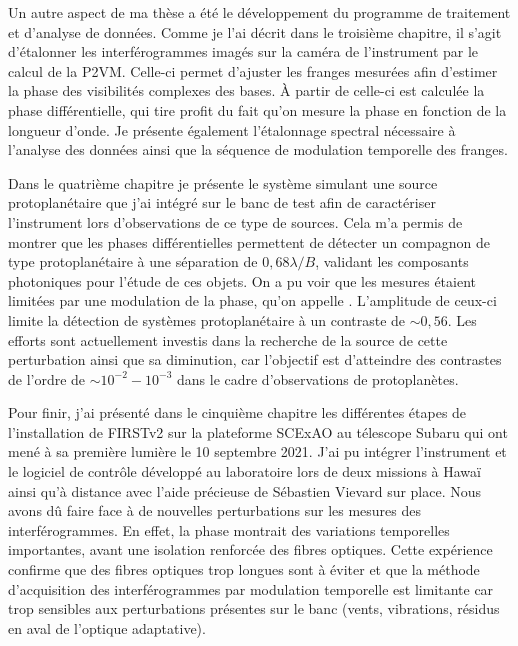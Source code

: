 Un autre aspect de ma thèse a été le développement du programme de traitement et d'analyse de données. Comme je l'ai décrit dans le troisième chapitre, il s'agit d'étalonner les interférogrammes imagés sur la caméra de l'instrument par le calcul de la P2VM. Celle-ci permet d'ajuster les franges mesurées afin d'estimer la phase des visibilités complexes des bases. À partir de celle-ci est calculée la phase différentielle, qui tire profit du fait qu'on mesure la phase en fonction de la longueur d'onde. Je présente également l'étalonnage spectral nécessaire à l'analyse des données ainsi que la séquence de modulation temporelle des franges.

Dans le quatrième chapitre je présente le système simulant une source protoplanétaire que j'ai intégré sur le banc de test afin de caractériser l'instrument lors d'observations de ce type de sources. Cela m'a permis de montrer que les phases différentielles permettent de détecter un compagnon de type protoplanétaire à une séparation de $0,68 \lambda / B$, validant les composants photoniques pour l'étude de ces objets. On a pu voir que les mesures étaient limitées par une modulation de la phase, qu'on appelle \wiggles. L'amplitude de ceux-ci limite la détection de systèmes protoplanétaire à un contraste de $\sim 0,56$. Les efforts sont actuellement investis dans la recherche de la source de cette perturbation ainsi que sa diminution, car l'objectif est d'atteindre des contrastes de l'ordre de $\sim 10^{-2} - 10^{-3}$ dans le cadre d'observations de protoplanètes.

Pour finir, j'ai présenté dans le cinquième chapitre les différentes étapes de l'installation de FIRSTv2 sur la plateforme SCExAO au télescope Subaru qui ont mené à sa première lumière le 10 septembre 2021. J'ai pu intégrer l'instrument et le logiciel de contrôle développé au laboratoire lors de deux missions à Hawaï ainsi qu'à distance avec l'aide précieuse de Sébastien Vievard sur place. Nous avons dû faire face à de nouvelles perturbations sur les mesures des interférogrammes. En effet, la phase montrait des variations temporelles importantes, avant une isolation renforcée des fibres optiques. Cette expérience confirme que des fibres optiques trop longues sont à éviter et que la méthode d'acquisition des interférogrammes par modulation temporelle est limitante car trop sensibles aux perturbations présentes sur le banc (vents, vibrations, résidus en aval de l'optique adaptative).

